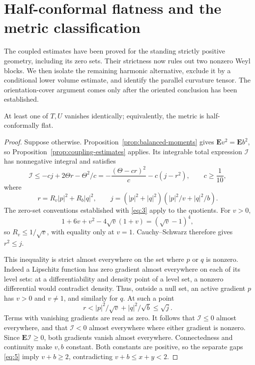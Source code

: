 \section{Half-conformal flatness and the metric classification}
\label{sec:classification}

The coupled estimates have been proved for the standing strictly
positive geometry, including its zero sets. Their strictness now rules
out two nonzero Weyl blocks. We then isolate the remaining harmonic
alternative, exclude it by a conditional lower volume estimate, and
identify the parallel curvature tensor. The orientation-cover argument
comes only after the oriented conclusion has been established.

\begin{proposition}\label{prop:one-block-vanishes}
At least one of $T,U$ vanishes identically; equivalently, the metric is
half-conformally flat.
\end{proposition}
\begin{proof}
Suppose otherwise. Proposition~\ref{prop:balanced-moments} gives $\mathbf E v^2=\mathbf E b^2$, so Proposition~\ref{prop:coupling-estimates} applies. Its integrable total expression $\mathcal I$ has nonnegative integral and satisfies
\[
 \mathcal I\le-cj+2\Theta r-\Theta^2/c
 =-\frac{(\Theta-cr)^2}{c}-c(j-r^2),\qquad c\ge\frac1{10},
\]
where
\[
 r=R_v|p|^2+R_b|q|^2,\qquad
 j=(|p|^2+|q|^2)(|p|^2/v+|q|^2/b).
\]
The zero-set conventions established with \eqref{eq:3} apply to the quotients. For $v>0$,
\[
 1+6v+v^2-4\sqrt v(1+v)=(\sqrt v-1)^4,
\]
so $R_v\le1/\sqrt v$, with equality only at $v=1$. Cauchy--Schwarz therefore gives $r^2\le j$.

This inequality is strict almost everywhere on the set where $p$ or $q$ is nonzero. Indeed a Lipschitz function has zero gradient almost everywhere on each of its level sets: at a differentiability and density point of a level set, a nonzero differential would contradict density. Thus, outside a null set, an active gradient $p$ has $v>0$ and $v\ne1$, and similarly for $q$. At such a point
\[
 r< |p|^2/\sqrt v+|q|^2/\sqrt b\le\sqrt j.
\]
Terms with vanishing gradients are read as zero. It follows that $\mathcal I\le0$ almost everywhere, and that $\mathcal I<0$ almost everywhere where either gradient is nonzero. Since $\mathbf E\mathcal I\ge0$, both gradients vanish almost everywhere. Connectedness and continuity make $v,b$ constant. Both constants are positive, so the separate gaps \eqref{eq:5} imply $v+b\ge2$, contradicting $v+b\le x+y<2$.
\end{proof}

